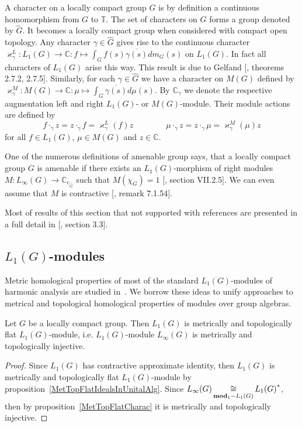 A character on a locally compact group $G$ is by definition a continuous 
homomorphism from $G$ to $\mathbb{T}$. The set of characters on $G$ forms a 
group denoted by $\widehat{G}$. It becomes a locally compact group when 
considered with compact open topology. Any character $\gamma\in\widehat{G}$ 
gives rise to the continuous character 
$\varkappa_\gamma^L
:L_1(G)\to\mathbb{C}
:f\mapsto \int_G f(s)\overline{\gamma(s)}dm_G(s)$ on $L_1(G)$. In fact all 
characters of $L_1(G)$ arise this way. This result is due to 
Gelfand [\cite{KaniBanAlg}, theorems 2.7.2, 2.7.5]. Similarly, for 
each $\gamma\in\widehat{G}$ we have a character on $M(G)$ defined by 
$\varkappa_\gamma^M
:M(G)\to\mathbb{C}
:\mu\mapsto\int_{G} \overline{\gamma(s)}d\mu(s)$. By $\mathbb{C}_\gamma$ we 
denote the respective augmentation left and right $L_1(G)$- or $M(G)$-module. 
Their module actions are defined by
$$
f\cdot_{\gamma}z=z\cdot_{\gamma}f=\varkappa_\gamma^L(f)z \qquad\qquad
\mu\cdot_{\gamma}z=z\cdot_{\gamma}\mu=\varkappa_\gamma^M(\mu)z
$$
for all $f\in L_1(G)$, $\mu\in M(G)$ and $z\in\mathbb{C}$. 

One of the numerous definitions of amenable group says, that a locally compact 
group $G$ is amenable if there exists an $L_1(G)$-morphism of right 
modules $M:L_\infty(G)\to\mathbb{C}_{e_{\widehat{G}}}$ such 
that $M(\chi_G)=1$ [\cite{HelBanLocConvAlg}, section VII.2.5]. We can even 
assume that $M$ is contractive [\cite{HelBanLocConvAlg}, remark 7.1.54].

Most of results of this section that not supported with references are 
presented in a full detail in [\cite{DalBanAlgAutCont}, section 3.3].


\subsection{
    \texorpdfstring{$L_1(G)$}{L1(G)}-modules
}\label{SubSectionL1GModules}

Metric homological properties of most of the standard $L_1(G)$-modules of 
harmonic analysis are studied in~\cite{GravInjProjBanMod}. We borrow these 
ideas to unify approaches to metrical and topological homological properties 
of modules over group algebras.

\begin{proposition}\label{LInfIsL1MetrInj} Let $G$ be a locally compact group. 
Then $L_1(G)$ is metrically and topologically flat $L_1(G)$-module, 
i.e. $L_1(G)$-module $L_\infty(G)$ is metrically and topologically injective.
\end{proposition} 
\begin{proof} Since $L_1(G)$ has contractive approximate identity, 
then $L_1(G)$ is metrically and topologically flat $L_1(G)$-module 
by proposition~\ref{MetTopFlatIdealsInUnitalAlg}. 
Since $L_\infty(G)\mathop{\mathbin{\cong}}\limits_{\mathbf{mod}_1-L_1(G)}{L_1(G)}^*$, then by 
proposition~\ref{MetTopFlatCharac} it is metrically and topologically injective.
\end{proof}

